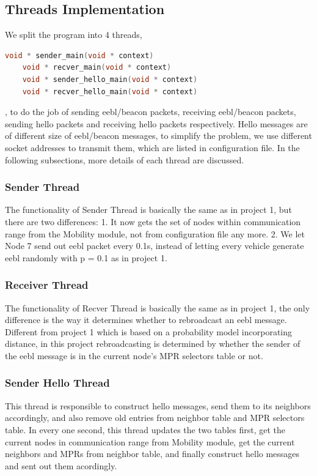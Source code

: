 \documentclass[twocolumn]{article}
\begin{document}
\subsection{Threads Implementation}
\par{We split the program into 4 threads, }
\begin{lstlisting}[language=C++,keywordstyle=\color{blue}]
    void * sender_main(void * context)
    void * recver_main(void * context)
    void * sender_hello_main(void * context)
    void * recver_hello_main(void * context)
\end{lstlisting}
    \par{, to do the job of sending eebl/beacon packets, receiving eebl/beacon packets, sending hello packets and receiving hello packets respectively. Hello messages are of different size of eebl/beacon messages, to simplify the problem, we use different socket addresses to transmit them, which are listed in configuration file. In the following subsections, more details of each thread are discussed.}
    \subsubsection{Sender Thread}
    \par{The functionality of Sender Thread is basically the same as in project 1, but there are two differences: 1. It now gets the set of nodes within communication range from the Mobility module, not from configuration file any more. 2. We let Node 7 send out eebl packet every 0.1s, instead of letting every vehicle generate eebl randomly with p = 0.1 as in project 1.}
    \subsubsection{Receiver Thread}
    \par{The functionality of Recver Thread is basically the same as in project 1, the only difference is the way it determines whether to rebroadcast an eebl message. Different from project 1 which is based on a probability model incorporating distance, in this project rebroadcasting is determined by whether the sender of the eebl message is in the current node's MPR selectors table or not.}

    \subsubsection{Sender Hello Thread}
    \label{sec:sender_hello_main}
    \par{This thread is responsible to construct hello messages, send them to its neighbors accordingly, and also remove old entries from neighbor table and MPR selectors table. In every one second, this thread updates the two tables first, get the current nodes in communication range from Mobility module, get the current neighbors and MPRs from neighbor table, and finally construct hello messages and sent out them acordingly.}
\end{document}
